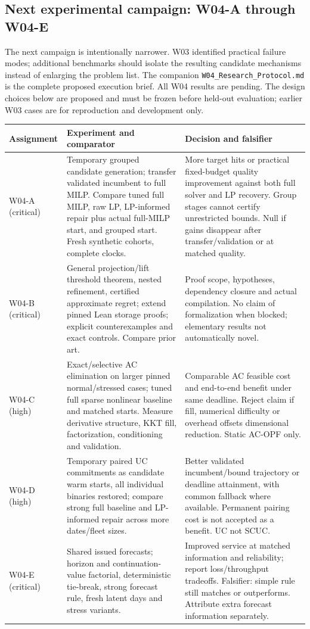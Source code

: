 \documentclass[11pt,letterpaper]{article}
\begin{document}
\subsection{Next experimental campaign: W04-A through W04-E}
\label{sec:w04}
The next campaign is intentionally narrower. W03 identified practical failure modes; additional benchmarks should isolate the resulting candidate mechanisms instead of enlarging the problem list. The companion \texttt{W04\_Research\_Protocol.md} is the complete proposed execution brief. All W04 results are pending. The design choices below are proposed and must be frozen before held-out evaluation; earlier W03 cases are for reproduction and development only.

\begin{longtable}{P{.14\linewidth}P{.41\linewidth}P{.36\linewidth}}
\toprule Assignment & Experiment and comparator & Decision and falsifier\\\midrule\endhead
W04-A (critical) & Temporary grouped candidate generation; transfer validated incumbent to full MILP. Compare tuned full MILP, raw LP, LP-informed repair plus actual full-MILP start, and grouped start. Fresh synthetic cohorts, complete clocks. & More target hits or practical fixed-budget quality improvement against both full solver and LP recovery. Group stages cannot certify unrestricted bounds. Null if gains disappear after transfer/validation or at matched quality.\\
W04-B (critical) & General projection/lift threshold theorem, nested refinement, certified approximate regret; extend pinned Lean storage proofs; explicit counterexamples and exact controls. Compare prior art. & Proof scope, hypotheses, dependency closure and actual compilation. No claim of formalization when blocked; elementary results not automatically novel.\\
W04-C (high) & Exact/selective AC elimination on larger pinned normal/stressed cases; tuned full sparse nonlinear baseline and matched starts. Measure derivative structure, KKT fill, factorization, conditioning and validation. & Comparable AC feasible cost and end-to-end benefit under same deadline. Reject claim if fill, numerical difficulty or overhead offsets dimensional reduction. Static AC-OPF only.\\
W04-D (high) & Temporary paired UC commitments as candidate warm starts, all individual binaries restored; compare strong full baseline and LP-informed repair across more dates/fleet sizes. & Better validated incumbent/bound trajectory or deadline attainment, with common fallback where available. Permanent pairing cost is not accepted as a benefit. UC not SCUC.\\
W04-E (critical) & Shared issued forecasts; horizon and continuation-value factorial, deterministic tie-break, strong forecast rule, fresh latent days and stress variants. & Improved service at matched information and reliability; report loss/throughput tradeoffs. Falsifier: simple rule still matches or outperforms. Attribute extra forecast information separately.\\
\bottomrule
\end{longtable}
\end{document}
